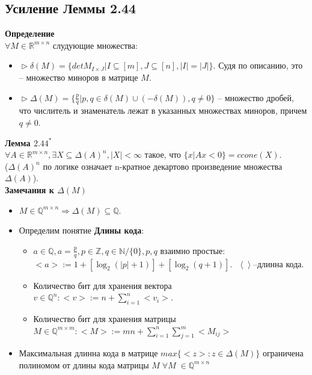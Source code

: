 \subsection{Усиление Леммы 2.44}
\noindent\textbf{Определение}\\
$\forall M \in \mathbb{R}^{m\times n}$ слудующие множества:
\begin{itemize}
\item $\vartriangleright \delta(M)=\{det M_{I\times J}| I\subseteq[m], J\subseteq[n],|I|=|J|\}$. Судя по описанию, это -- множество миноров в матрице $M$.
\item $\vartriangleright \Delta(M)=\{\frac{p}{q}| p,q \in\delta(M)\cup(-\delta(M)), q\neq0\}$ -- множество дробей, что числитель и знаменатель лежат в указанных множествах миноров, причем $q\neq 0$.
\end{itemize}
\noindent\textbf{Лемма $2.44^{\ast}$}\\
$\forall A\in\mathbb{R}^{m\times n},\exists X \subseteq\Delta(A)^{n}, |X|<\infty$ такое, что $\{x|Ax<0\}=ccone(X)$.\\
($\Delta(A)^{n}$ по логике означает n-кратное декартово произведение множества $\Delta(A)$).\\

\noindent\textbf{Замечания к $\Delta(M)$}
\begin{itemize}
\item $M\in \mathbb{Q}^{m\times n} \Longrightarrow \Delta(M)\subseteq \mathbb{Q}.$
\item Определим понятие \textbf{Длины кода}:
\begin{itemize}
\item $a\in \mathbb{Q}, a=\frac{p}{q}, p \in \mathbb{Z},q \in \mathbb{N}/\{0\}, p, q$ взаимно простые:$ <a>:=1+[\log_{2}(|p|+1)]+[\log_{2}(q+1)]. \text{ } \left\langle\right\rangle$--длинна кода.
\end{itemize}
\begin{itemize}
\item Количество бит для хранения вектора $v\in \mathbb{Q}^{n}: <v>:=n+\sum\limits_{i=1}^n<v_{i}>.$
\end{itemize}
\begin{itemize}
\item Количество бит для хранения матрицы $M \in \mathbb{Q}^{m\times m}: <M>:=mn+\sum\limits_{i=1}^n \sum\limits_{j=1}^m<M_{ij}>$
\end{itemize}
\end{itemize}
\begin{itemize}
\item Максимальная длинна кода в матрице $max\{<z>: z\in \Delta(M)\}$ ограничена полиномом от длины кода матрицы $M \;  \forall M \; \in \mathbb{Q}^{m\times n}$
\end{itemize}

